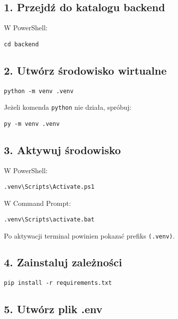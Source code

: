 \documentclass[11pt,a4paper]{article}
\begin{document}
\subsection{1. Przejdź do katalogu backend}

W PowerShell:

\begin{lstlisting}
cd backend
\end{lstlisting}

\subsection{2. Utwórz środowisko wirtualne}

\begin{lstlisting}
python -m venv .venv
\end{lstlisting}

Jeżeli komenda \texttt{python} nie działa, spróbuj:

\begin{lstlisting}
py -m venv .venv
\end{lstlisting}

\subsection{3. Aktywuj środowisko}

W PowerShell:

\begin{lstlisting}
.venv\Scripts\Activate.ps1
\end{lstlisting}

W Command Prompt:

\begin{lstlisting}
.venv\Scripts\activate.bat
\end{lstlisting}

Po aktywacji terminal powinien pokazać prefiks \texttt{(.venv)}.

\subsection{4. Zainstaluj zależności}

\begin{lstlisting}
pip install -r requirements.txt
\end{lstlisting}

\subsection{5. Utwórz plik .env}
\end{document}
